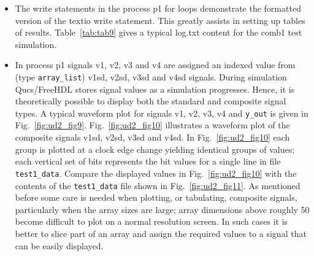 \begin{itemize}
\item The write statements in the process p1 for loops demonstrate the formatted version of the textio write statement. This greatly assists in setting up tables of results. Table~\ref{tab:tab9} gives a typical log.txt content for the comb1 test simulation.
\item In process p1 signals v1, v2, v3 and v4 are assigned an indexed value from (type \verb|array_list|) v1sd, v2sd, v3sd and v4sd signals. During simulation Qucs/FreeHDL stores signal values as a simulation progresses. Hence, it is theoretically possible to display both the standard and composite signal types.  A typical waveform plot for signals v1, v2, v3, v4 and \verb|y_out| is given in Fig.~\ref{fig:ud2_fig9}.  Fig.~\ref{fig:ud2_fig10} illustrates a waveform plot of the composite signals v1sd, v2sd, v3sd and v4sd. In Fig.~\ref{fig:ud2_fig10} each group is plotted at a clock edge change yielding identical groups of values; each vertical set of bits represents the bit values for a single line in file \verb|test1_data|.  Compare the displayed values in Fig.~\ref{fig:ud2_fig10} with the contents of the \verb|test1_data| file shown in Fig.~\ref{fig:ud2_fig11}.  As mentioned before some care is needed when plotting, or tabulating, composite signals, particularly when the array sizes are large; array dimensions above roughly 50 become difficult to plot on a normal resolution screen.  In such cases it is better to slice part of an array and assign the required values to a signal that can be easily displayed.
\end{itemize}

\FloatBarrier  

